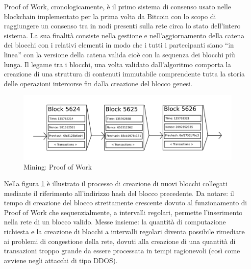 Proof of Work, cronologicamente, è il primo sistema di consenso usato nelle blockchain implementato per la prima volta da Bitcoin con lo scopo di raggiungere un consenso tra in nodi presenti sulla rete circa lo stato dell’intero sistema. La sua finalità consiste nella gestione e nell'aggiornamento della catena dei blocchi con i relativi elementi in modo che i tutti i partecipanti siano “in linea” con la versione della catena valida cioè con la sequenza dei blocchi più lunga. Il legame tra i blocchi, una volta validato dall'algoritmo comporta la creazione di una struttura di contenuti immutabile comprendente tutta la storia delle operazioni intercorse fin dalla creazione del blocco genesi.

\begin{figure}[H]
\centering
\includegraphics[width=1\textwidth]{immagini/mining_pow.png}
\caption{Mining: Proof of Work}
\label{fig:ProofOfWork}
\end{figure}

Nella figura \ref{fig:ProofOfWork} è illustrato il processo di creazione di nuovi blocchi collegati mediante il riferimento all'indirizzo hash del blocco precedente. Da notare: il tempo di creazione del blocco strettamente crescente dovuto al funzionamento di Proof of Work che sequenzialmente, a intervalli regolari, permette l'inserimento nella rete di un blocco valido. Messe insieme: la quantità di computazione richiesta e la creazione di blocchi a intervalli regolari diventa possibile rimediare ai problemi di congestione della rete, dovuti alla creazione di una quantità di transazioni troppo grande da essere processata in tempi ragionevoli (così come avviene negli attacchi di tipo DDOS).

